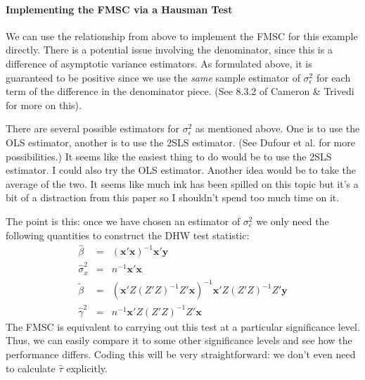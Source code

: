 \documentclass[12pt]{article}
\theoremstyle{definition}
\begin{document}
\paragraph{Implementing the FMSC via a Hausman Test}
We can use the relationship from above to implement the FMSC for this example directly. There is a potential issue involving the denominator, since this is a difference of asymptotic variance estimators. As formulated above, it is guaranteed to be positive since we use the \emph{same} sample estimator of $\sigma^2_\epsilon$ for each term of the difference in the denominator piece. (See 8.3.2 of Cameron \& Trivedi for more on this). 

There are several possible estimators for $\sigma_\epsilon^2$ as mentioned above. One is to use the OLS estimator, another is to use the 2SLS estimator. (See Dufour et al. for more possibilities.) It seems like the easiest thing to do would be to use the 2SLS estimator. I could also try the OLS estimator. Another idea would be to take the average of the two. It seems like much ink has been spilled on this topic but it's a bit of a distraction from this paper so I shouldn't spend too much time on it.

The point is this: once we have chosen an estimator of $\sigma_\epsilon^2$ we only need the following quantities to construct the DHW test statistic:
  \begin{eqnarray*}
    \widehat{\beta} &=& (\mathbf{x}'\mathbf{x})^{-1}\mathbf{x}'\mathbf{y}\\
    \widehat{\sigma}_x^2 &=& n^{-1}\mathbf{x}'\mathbf{x} \\
    \widetilde{\beta} &=& (\mathbf{x}'Z(Z'Z)^{-1} Z'\mathbf{x})^{-1}\mathbf{x}'Z (Z'Z)^{-1} Z'\mathbf{y}\\
    \widehat{\gamma}^2 &=& n^{-1} \mathbf{x}'Z(Z'Z)^{-1}Z'\mathbf{x}
  \end{eqnarray*}
The FMSC is equivalent to carrying out this test at a particular significance level. Thus, we can easily compare it to some other significance levels and see how the performance differs. Coding this will be very straightforward: we don't even need to calculate $\widehat{\tau}$ explicitly. 

\end{document}
